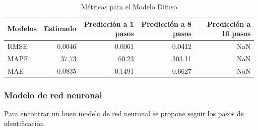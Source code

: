 \documentclass[12pt]{article}
\begin{document}
\begin{table}[htbp]
  \centering
  \caption{Métricas para el Modelo Difuso}
    \begin{tabular}{|l|r|r|r|r|}
    \toprule
    Modelos & \multicolumn{1}{l|}{Estimado} & \multicolumn{1}{p{6em}|}{Predicción a 1 pasos} & \multicolumn{1}{p{6.39em}|}{Predicción a 8 pasos} & \multicolumn{1}{p{5.445em}|}{Predicción a 16 pasos} \\
    \midrule
    RMSE  & 0.0046 & 0.0061 & 0.0412 & NaN \\
    \midrule
    MAPE  & 37.73 & 60.23 & 303.11 & NaN \\
    \midrule
    MAE   & 0.0835 & 0.1491 & 0.6627 & NaN \\
    \bottomrule
    \end{tabular}%
  \label{tab:addlabel}%
\end{table}%

\newpage
\subsubsection{Modelo de red neuronal}

Para encontrar un buen modelo de red neuronal se propone seguir los pasos de identificación.
\end{document}
